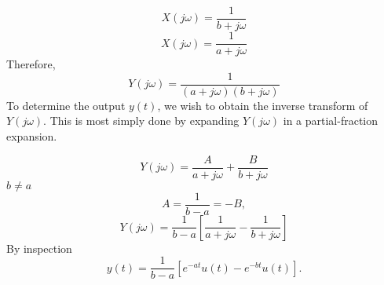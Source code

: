 \begin{frame}
    {
        \begin{equation*}
            X(j\omega) = \frac{1}{b+j\omega}
        \end{equation*}
        \pause
        \begin{equation*}
            X(j\omega) = \frac{1}{a+j\omega}
        \end{equation*}
        \pause
        Therefore,
        \begin{equation*}
            Y(j\omega) = \frac{1}{(a+j\omega)(b+j\omega)}
        \end{equation*}
        To determine the output $y(t)$, we wish to obtain the inverse transform of $Y(j\omega)$. This is most simply done by expanding $Y(j\omega)$ in a partial-fraction expansion.
    }
\end{frame}

\begin{frame}
    {
        \begin{equation*}
            Y(j\omega) = \frac{A}{a+j\omega} + \frac{B}{b+j\omega}
        \end{equation*}
        \pause
        $b \neq a$
        \begin{equation*}
            A = \frac{1}{b-a} = -B,
        \end{equation*}
        \begin{equation*}
            Y(j\omega) = \frac{1}{b-a}\left[\frac{1}{a+j\omega} - \frac{1}{b+j\omega}\right]
        \end{equation*}
        \pause
        By inspection
        \begin{equation*}
            y(t) = \frac{1}{b-a}\left[ e^{-at}u(t) - e^{-bt}u(t)\right].
        \end{equation*}
    }
\end{frame}


